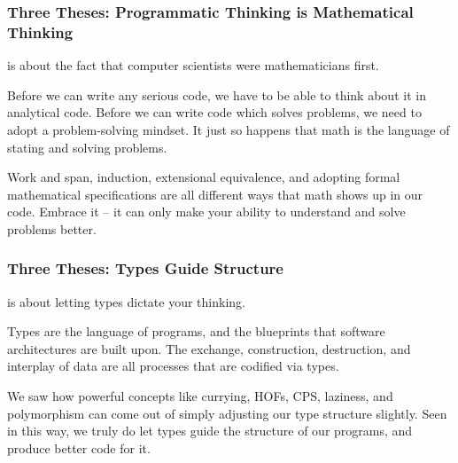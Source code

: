 \documentclass[aspectratio=169, handout]{beamer}
\begin{document}
\begin{frame}[fragile]
  \frametitle{Three Theses: Programmatic Thinking is Mathematical Thinking}

   is about the fact that
  computer scientists were mathematicians first.

  \pause
  \vspace{\fill}

  Before we can write any serious code, we have to be able to think about
  it in analytical code. Before we can write code which solves problems,
  we need to adopt a problem-solving mindset. It just so happens that
  math is the language of stating and solving problems.

  \pause
  \vspace{\fill}

  Work and span, induction, extensional equivalence, and adopting formal
  mathematical specifications are all different ways that math shows up in our
  code. Embrace it -- it can only make your ability to understand and
  solve problems better.
\end{frame}

\begin{frame}[fragile]
  \frametitle{Three Theses: Types Guide Structure}

   is about letting types dictate your thinking.

  \pause
  \vspace{\fill}

  Types are the language of programs, and the blueprints that software
  architectures are built upon. The exchange, construction, destruction,
  and interplay of data are all processes that are codified via
  types.

  \pause
  \vspace{\fill}

  We saw how powerful concepts like currying, HOFs, CPS, laziness, and
  polymorphism can come out of simply adjusting our type structure slightly.
  Seen in this way, we truly do let types guide the structure of our programs,
  and produce better code for it.
\end{frame}
\end{document}
